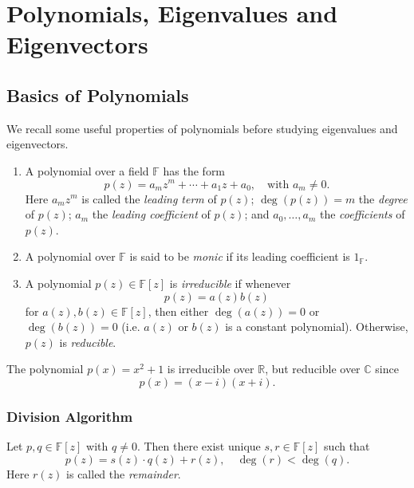 \chapter{Polynomials, Eigenvalues and Eigenvectors}
\section{Basics of Polynomials}

We recall some useful properties of polynomials before studying eigenvalues and eigenvectors.

\begin{definition}[Polynomial]\label{def:polynomial}
\leavevmode
\begin{enumerate}
  \item A polynomial over a field \(\mathbb{F}\) has the form
  \[
  p(z) = a_m z^m + \cdots + a_1 z + a_0, \quad \text{with } a_m \neq 0.
  \]
  Here \(a_m z^m\) is called the \emph{leading term} of $p(z)$; \(\deg(p(z)) =m\) the \emph{degree} of $p(z)$; \(a_m\) the \emph{leading coefficient} of $p(z)$; and \(a_0, \dots, a_m\) the \emph{coefficients} of $p(z)$.

  \item A polynomial over \(\mathbb{F}\) is said to be \emph{monic} if its leading coefficient is \(1_\mathbb{F}\).

  \item A polynomial \(p(z) \in \mathbb{F}[z]\) is \emph{irreducible} if whenever
  \[
  p(z) = a(z) b(z)
  \]
  for \(a(z), b(z) \in \mathbb{F}[z]\), then either \(\deg(a(z)) = 0\) or \(\deg(b(z)) = 0\) (i.e. $a(z)$ or $b(z)$ is a constant polynomial). Otherwise, \(p(z)\) is \emph{reducible}.
\end{enumerate}
\end{definition}

\begin{example}\label{ex:irreducible}
The polynomial \(p(x) = x^2 + 1\) is irreducible over \(\mathbb{R}\), but reducible over \(\mathbb{C}\) since
\[
p(x) = (x - i)(x + i).
\]
\end{example}

\subsection{Division Algorithm}
\begin{theorem}\label{thm:division}
Let \(p, q \in \mathbb{F}[z]\) with \(q \neq 0\). Then there exist unique \(s, r \in \mathbb{F}[z]\) such that
\[
p(z) = s(z) \cdot q(z) + r(z), \quad \deg(r) < \deg(q).
\]
Here \(r(z)\) is called the \emph{remainder}.
\end{theorem}

